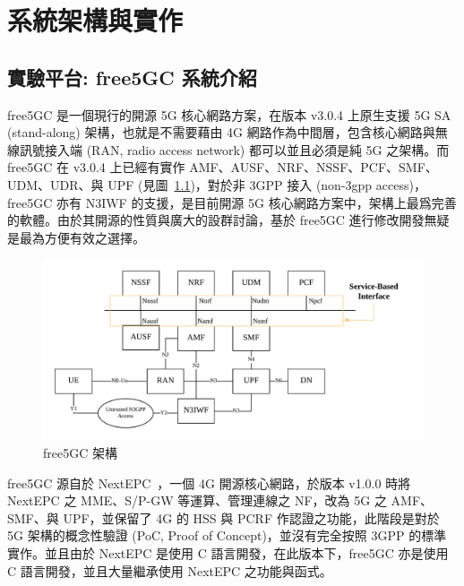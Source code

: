 \chapter{系統架構與實作}
\label{chapter:system}


\section{實驗平台: free5GC 系統介紹}
\label{sec:free5gc_intro}


free5GC 是一個現行的開源 5G 核心網路方案，在版本 v3.0.4 上原生支援 5G SA (stand-along) 架構，也就是不需要藉由 4G 網路作為中間層，包含核心網路與無線訊號接入端 (RAN, radio access network) 都可以並且必須是純 5G 之架構。而 free5GC 在 v3.0.4 上已經有實作 AMF、AUSF、NRF、NSSF、PCF、SMF、UDM、UDR、與 UPF (見圖~\ref{fig:free5gc_arch})，對於非 3GPP 接入 (non-3gpp access)，free5GC 亦有 N3IWF 的支援，是目前開源 5G 核心網路方案中，架構上最爲完善的軟體。由於其開源的性質與廣大的設群討論，基於 free5GC 進行修改開發無疑是最為方便有效之選擇。

\begin{figure}[htbp]
  \centering
  \includegraphics[height=!,width=1\linewidth,keepaspectratio=true]
                    {figures/free5gc-stage-2-arch}
  \caption[free5GC 架構]{{\footnotesize free5GC 架構~\cite{free5gc}}}
  \label{fig:free5gc_arch}
\end{figure}

free5GC 源自於 NextEPC~\cite{nextepc}，一個 4G 開源核心網路，於版本 v1.0.0 時將 NextEPC 之 MME、S/P-GW 等運算、管理連線之 NF，改為 5G 之 AMF、SMF、與 UPF，並保留了 4G 的 HSS 與 PCRF 作認證之功能，此階段是對於 5G 架構的概念性驗證 (PoC, Proof of Concept)，並沒有完全按照 3GPP 的標準實作。並且由於 NextEPC 是使用 C 語言開發，在此版本下，free5GC 亦是使用 C 語言開發，並且大量繼承使用 NextEPC 之功能與函式。

